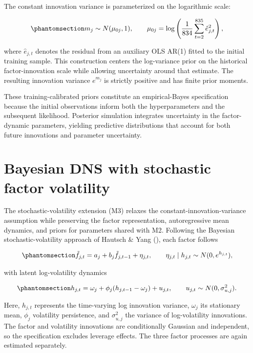 \documentclass[
  12pt,
  letterpaper,
  DIV=11,
  numbers=noendperiod]{scrreprt}
\begin{document}
The constant innovation variance is parameterized on the logarithmic
scale:

\begin{equation}\protect\phantomsection\label{eq-constant-variance-prior}{
m_j\sim N(\mu_{0j},1),
\qquad
\mu_{0j}
=\log \left(
\frac{1}{834}\sum_{t=2}^{835}
\hat e_{j,t}^{2}
\right),
}\end{equation}

where \(\hat e_{j,t}\) denotes the residual from an auxiliary OLS AR(1)
fitted to the initial training sample. This construction centers the
log-variance prior on the historical factor-innovation scale while
allowing uncertainty around that estimate. The resulting innovation
variance \(e^{m_j}\) is strictly positive and has finite prior moments.

These training-calibrated priors constitute an empirical-Bayes
specification because the initial observations inform both the
hyperparameters and the subsequent likelihood. Posterior simulation
integrates uncertainty in the factor-dynamic parameters, yielding
predictive distributions that account for both future innovations and
parameter uncertainty.

\section{Bayesian DNS with stochastic factor
volatility}\label{bayesian-dns-with-stochastic-factor-volatility}

The stochastic-volatility extension (M3) relaxes the
constant-innovation-variance assumption while preserving the factor
representation, autoregressive mean dynamics, and priors for parameters
shared with M2. Following the Bayesian stochastic-volatility approach of
Hautsch \& Yang (), each factor
follows

\begin{equation}\protect\phantomsection\label{eq-sv-factor}{
\tilde f_{j,t}
=a_j+b_j\tilde f_{j,t-1}+\eta_{j,t},
\qquad
\eta_{j,t}\mid h_{j,t}
\sim N(0,e^{h_{j,t}}),
}\end{equation}

with latent log-volatility dynamics

\begin{equation}\protect\phantomsection\label{eq-sv-state}{
h_{j,t}
=\omega_j+\phi_j(h_{j,t-1}-\omega_j)+u_{j,t},
\qquad
u_{j,t}\sim N(0,\sigma_{u,j}^2).
}\end{equation}

Here, \(h_{j,t}\) represents the time-varying log innovation variance,
\(\omega_j\) its stationary mean, \(\phi_j\) volatility persistence, and
\(\sigma_{u,j}^2\) the variance of log-volatility innovations. The
factor and volatility innovations are conditionally Gaussian and
independent, so the specification excludes leverage effects. The three
factor processes are again estimated separately.
\end{document}
